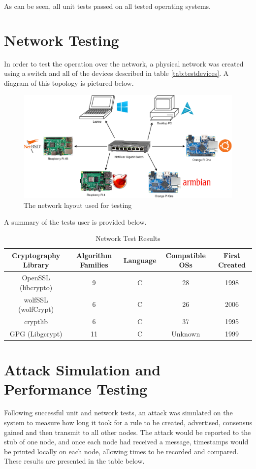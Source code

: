 \documentclass[a4paper, 11pt]{report}
\begin{document}
As can be seen, all unit tests passed on all tested operating systems.

\section{Network Testing}
In order to test the operation over the network, a physical network was created using a switch and all of the devices described in table \ref{tab:testdevices}. A diagram of this topology is pictured below.

\begin{figure}[H]
\centering
\includegraphics[width=\textwidth,keepaspectratio]{networkmap}
\caption{The network layout used for testing} 
\label{fig:networkmap}
\end{figure}

A summary of the tests user is provided below.

\begin{table}[H]
\centering
\begin{tabular}{ |c|c|c|c|c| } 
\hline
Cryptography Library & Algorithm Families & Language & Compatible OSs & First Created\\
\hline
OpenSSL (libcrypto)\cite{libcrypto} & 9 & C & 28 & 1998\\
wolfSSL (wolfCrypt)\cite{wolfCrypt} & 6 & C & 26 & 2006\\
cryptlib\cite{cryptlib} & 6 & C & 37 & 1995\\
GPG (Libgcrypt)\cite{libgcrypt} & 11 & C & Unknown & 1999\\
\hline
\end{tabular}
\caption{Network Test Results}
\label{tab:network}
\end{table}

\section{Attack Simulation and Performance Testing}
Following successful unit and network tests, an attack was simulated on the system to measure how long it took for a rule to be created, advertised, consensus gained and then transmit to all other nodes. The attack would be reported to the \gls{stub} of one node, and once each node had received a message, timestamps would be printed locally on each node, allowing times to be recorded and compared. These results are presented in the table below.
\end{document}
